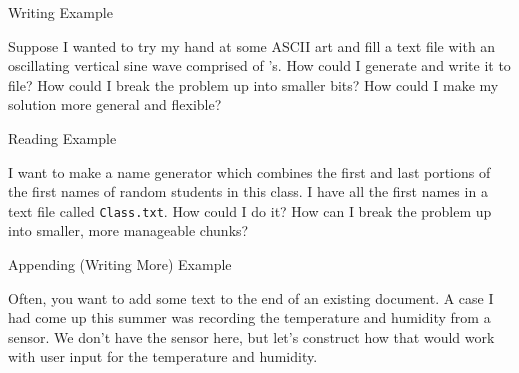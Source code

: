 \documentclass[pdf, aspectratio=169, 12pt]{beamer}
\begin{document}
\begin{frame}{Writing Example}
	\begin{example}
		Suppose I wanted to try my hand at some ASCII art and fill a text file with an oscillating vertical sine wave comprised of 's. How could I generate and write it to file? How could I break the problem up into smaller bits? How could I make my solution more general and flexible?
	\end{example}
\end{frame}

\begin{frame}{Reading Example}
	\begin{example}
		I want to make a name generator which combines the first and last portions of the first names of random students in this class. I have all the first names in a text file called \texttt{Class.txt}. How could I do it? How can I break the problem up into smaller, more manageable chunks?
	\end{example}
\end{frame}

\begin{frame}{Appending (Writing More) Example}
	\begin{example}
		Often, you want to add some text to the end of an existing document. A case I had come up this summer was recording the temperature and humidity from a sensor. We don't have the sensor here, but let's construct how that would work with user input for the temperature and humidity.
	\end{example}
\end{frame}

\end{document}
